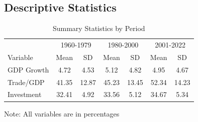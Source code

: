 \documentclass[12pt,a4paper]{article}
\theoremstyle{definition}
\begin{document}
\subsection{Descriptive Statistics}
\begin{table}[H]
\centering
\caption{Summary Statistics by Period}
\begin{threeparttable}
\begin{tabular}{lcccccc}
\toprule
& \multicolumn{2}{c}{1960-1979} & \multicolumn{2}{c}{1980-2000} & \multicolumn{2}{c}{2001-2022} \\
\cmidrule(lr){2-3} \cmidrule(lr){4-5} \cmidrule(lr){6-7}
Variable & Mean & SD & Mean & SD & Mean & SD \\
\midrule
GDP Growth & 4.72 & 4.53 & 5.12 & 4.82 & 4.95 & 4.67 \\
Trade/GDP & 41.35 & 12.87 & 45.23 & 13.45 & 52.34 & 14.23 \\
Investment & 32.41 & 4.92 & 33.56 & 5.12 & 34.67 & 5.34 \\
\bottomrule
\end{tabular}
\begin{tablenotes}
\small
\item Note: All variables are in percentages
\end{tablenotes}
\end{threeparttable}
\end{table}
\end{document}
